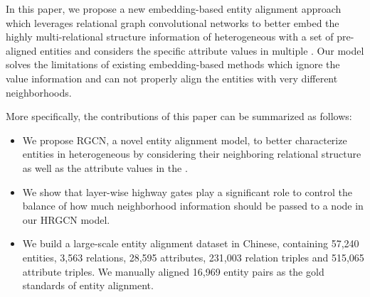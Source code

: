 	
	In this paper, we propose a new embedding-based entity alignment approach which leverages relational graph convolutional networks to better embed the highly multi-relational structure information of heterogeneous \KGs with a set of pre-aligned entities and considers the specific attribute values in multiple \KGs. Our model solves the limitations of existing embedding-based methods which ignore the value information and can not properly align the entities with very different neighborhoods.
	
	More specifically, the contributions of this paper can be summarized as follows:
	\begin{itemize}
		\item We propose RGCN, a novel entity alignment model, to better characterize entities in heterogeneous \KGs by considering their neighboring relational structure as well as the attribute values in the \KGs.
		
		\item We show that layer-wise highway gates play a significant role to control the balance of how much neighborhood information should be passed to a node in our HRGCN model.
		
		\item We build a large-scale entity alignment dataset in Chinese, containing 57,240 entities, 3,563 relations, 28,595 attributes, 231,003 relation triples and 515,065 attribute triples. We manually aligned 16,969 entity pairs as the gold standards of entity alignment.
		
	\end{itemize}

